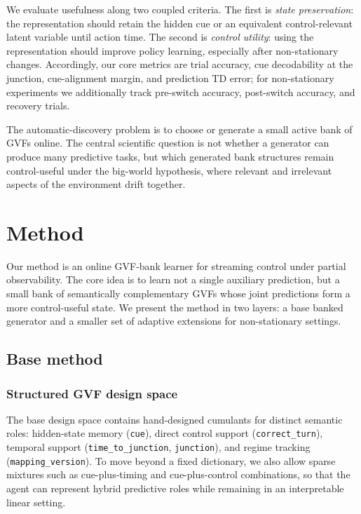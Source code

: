 \documentclass[11pt]{article}
\begin{document}
We evaluate usefulness along two coupled criteria. The first is \emph{state preservation}: the representation should retain the hidden cue or an equivalent control-relevant latent variable until action time. The second is \emph{control utility}: using the representation should improve policy learning, especially after non-stationary changes. Accordingly, our core metrics are trial accuracy, cue decodability at the junction, cue-alignment margin, and prediction TD error; for non-stationary experiments we additionally track pre-switch accuracy, post-switch accuracy, and recovery trials.

The automatic-discovery problem is to choose or generate a small active bank of GVFs online. The central scientific question is not whether a generator can produce many predictive tasks, but which generated bank structures remain control-useful under the big-world hypothesis, where relevant and irrelevant aspects of the environment drift together.

\section{Method}
Our method is an online GVF-bank learner for streaming control under partial observability. The core idea is to learn not a single auxiliary prediction, but a small bank of semantically complementary GVFs whose joint predictions form a more control-useful state. We present the method in two layers: a base banked generator and a smaller set of adaptive extensions for non-stationary settings.

\subsection{Base method}
\subsubsection{Structured GVF design space}
The base design space contains hand-designed cumulants for distinct semantic roles: hidden-state memory (\texttt{cue}), direct control support (\texttt{correct\_turn}), temporal support (\texttt{time\_to\_junction}, \texttt{junction}), and regime tracking (\texttt{mapping\_version}). To move beyond a fixed dictionary, we also allow sparse mixtures such as cue-plus-timing and cue-plus-control combinations, so that the agent can represent hybrid predictive roles while remaining in an interpretable linear setting.
\end{document}

